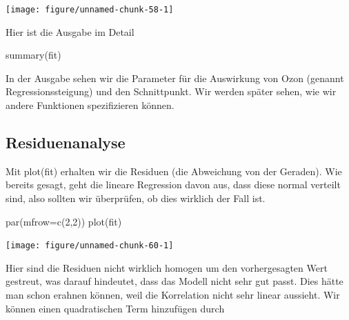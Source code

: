 \documentclass[a4paper,twoside]{tufte-book}\usepackage[]{graphicx}\usepackage[]{color}
\begin{document}
\begin{appendices}
\begin{Schunk}
\texttt{[image: figure/unnamed-chunk-58-1]} \end{Schunk}

Hier ist die Ausgabe im Detail

\begin{Schunk}
\begin{Sinput}
summary(fit)
\end{Sinput}
\end{Schunk}

In der Ausgabe sehen wir die Parameter für die Auswirkung von Ozon (genannt Regressionssteigung) und den Schnittpunkt. Wir werden später sehen, wie wir andere Funktionen spezifizieren können. 

\subsection{Residuenanalyse}

Mit plot(fit) erhalten wir die Residuen (die Abweichung von der Geraden). Wie bereits gesagt, geht die lineare Regression davon aus, dass diese normal verteilt sind, also sollten wir überprüfen, ob dies wirklich der Fall ist.

\begin{Schunk}
\begin{Sinput}
par(mfrow=c(2,2))
plot(fit)
\end{Sinput}

\texttt{[image: figure/unnamed-chunk-60-1]} \end{Schunk}

Hier sind die Residuen nicht wirklich homogen um den vorhergesagten Wert gestreut, was darauf hindeutet, dass das Modell nicht sehr gut passt. Dies hätte man schon erahnen können, weil die Korrelation nicht sehr linear aussieht. Wir können einen quadratischen Term hinzufügen durch


\end{appendices}
\end{document}
